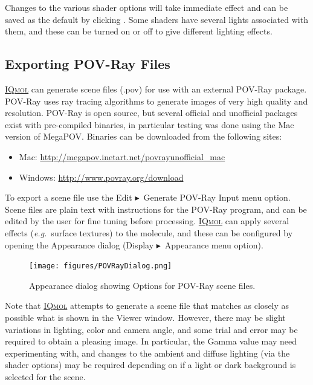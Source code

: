 \documentclass[a4paper,12pt]{article}
\newcommand{\iqmol}{\href{http://iqmol.org}{{\scshape IQmol}}}
\newcommand{\bt}{\ensuremath{\blacktriangleright}}
\newcommand{\eg}{\emph{e.g.}}
\begin{document}
Changes to the various shader options will take immediate effect and can be saved 
as the default by clicking .  Some shaders have several
lights associated with them, and these can be turned on or off to give different
lighting effects.


\subsection{Exporting POV-Ray Files}

\iqmol{} can generate scene files (.pov) for use with an external POV-Ray package.
POV-Ray uses ray tracing algorithms to generate images of very high quality and
resolution.  POV-Ray is open source, but several official and unofficial
packages exist with pre-compiled binaries, in particular testing was done using
the Mac version of MegaPOV.  Binaries can be downloaded from the
following sites:
\begin{itemize}
\itemsep0em
\item Mac: \url{http://megapov.inetart.net/povrayunofficial_mac}
\item Windows: \url{http://www.povray.org/download}
\end{itemize}

To export a scene file use the Edit \bt\ Generate POV-Ray Input menu option.
Scene files are plain text with instructions for the POV-Ray program, and can
be edited by the user for fine tuning before processing.  \iqmol{} can apply
several effects (\eg\ surface textures) to the molecule, and these can be
configured by opening the Appearance dialog (Display \bt\ Appearance menu
option).

\begin{figure}[h]
\begin{center}
\texttt{[image: figures/POVRayDialog.png]}
\caption{Appearance dialog showing Options for POV-Ray scene files.}
\end{center}
\end{figure}

Note that \iqmol{} attempts to generate a scene file that matches as closely as
possible what is shown in the Viewer window.  However, there may be slight
variations in lighting, color and camera angle, and some trial and error may be
required to obtain a pleasing image.  In particular, the Gamma value may need
experimenting with, and changes to the ambient and diffuse lighting (via the
shader options) may be required depending on if a light or dark background is
selected for the scene.
\end{document}
